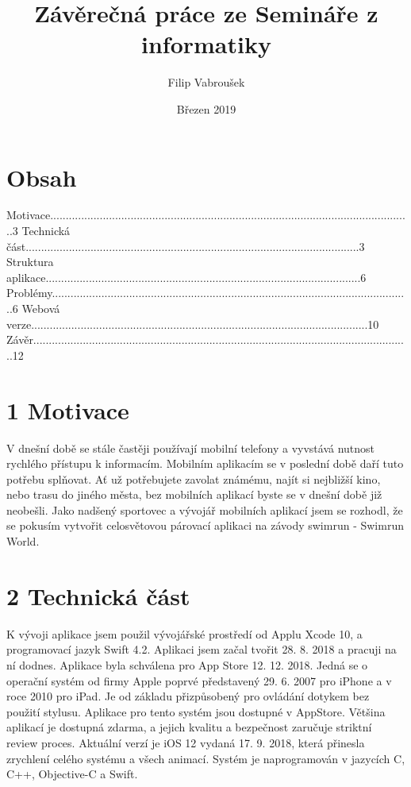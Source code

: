 \documentclass{article}
\title{Závěrečná práce ze Semináře z informatiky}
\author{Filip Vabroušek }
\date{Březen 2019}
\begin{document}
\maketitle
\vspace{130 mm}
\section*{Obsah}

Motivace.....................................................................................................................3 \hfill \break
Technická část............................................................................................................3 \hfill \break
Struktura aplikace......................................................................................................6  \hfill \break
Problémy....................................................................................................................6  \hfill \break
Webová verze.............................................................................................................10  \hfill \break
Závěr..........................................................................................................................12  \hfill \break


\vspace{180 mm}
\section*{ 1 Motivace}

	V dnešní době se stále častěji používají mobilní telefony a vyvstává nutnost rychlého  přístupu k informacím. Mobilním aplikacím se v poslední době daří tuto potřebu splňovat. Ať už potřebujete zavolat známému, najít si nejbližší kino, nebo trasu do jiného města, bez mobilních aplikací byste se v dnešní době již neobešli. Jako nadšený sportovec a vývojář mobilních aplikací jsem se rozhodl, že se pokusím vytvořit celosvětovou párovací aplikaci na závody swimrun - Swimrun World.




\vspace{10 mm}
\section*{2 Technická část}

K vývoji aplikace jsem použil vývojářské prostředí od Applu Xcode 10, a programovací jazyk Swift 4.2. Aplikaci jsem začal tvořit 28. 8. 2018 a pracuji na ní dodnes. Aplikace byla schválena pro App Store 12. 12. 2018.
 \hfill \break
 \hfill \break
Jedná se o operační systém od firmy Apple poprvé představený 29. 6. 2007 pro iPhone a v roce 2010 pro iPad.  Je od základu přizpůsobený pro ovládání dotykem bez použití stylusu. Aplikace pro tento systém jsou dostupné v AppStore. Většina aplikací je dostupná zdarma, a jejich kvalitu a bezpečnost zaručuje striktní review proces. Aktuální verzí je iOS 12 vydaná 17. 9. 2018, která přinesla zrychlení celého systému a všech animací. Systém je naprogramován v jazycích C, C++, Objective-C a Swift.
\end{document}
